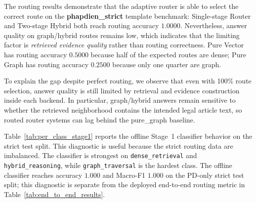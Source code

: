 \documentclass[11pt,twocolumn]{article}
\begin{document}
\begin{table}[!htbp]
\centering
\caption{End-to-end QA results on the strict Vietnamese legal QA test set. EM is near zero for all systems because legal answers are paraphrastic; F1 is the primary metric.}
\label{tab:end_to_end_results}
\scriptsize
\setlength{\tabcolsep}{2.4pt}
\end{table}

The routing results demonstrate that the adaptive router is
able to select the correct route on the \textbf{phapdien\_strict}
template benchmark: Single-stage Router and Two-stage Hybrid both
reach routing accuracy $1.0000$. Nevertheless, answer quality on
graph/hybrid routes remains low, which indicates that the limiting
factor is \emph{retrieved evidence quality} rather than routing
correctness. Pure Vector has routing accuracy $0.5000$ because
half of the expected routes are dense; Pure Graph has routing
accuracy $0.2500$ because only one quarter are graph.

To explain the gap despite perfect routing, we observe that
even with 100\% route selection, answer quality is still limited by
retrieval and evidence construction inside each backend.
In particular, graph/hybrid answers remain sensitive to whether the
retrieved neighborhood contains the intended legal article text,
so routed router systems can lag behind the pure\_graph baseline.

Table~\ref{tab:per_class_stage1} reports the offline Stage~1
classifier behavior on the strict test split. This diagnostic
is useful because the strict routing data are imbalanced. The
classifier is strongest on \texttt{dense\_retrieval} and
\texttt{hybrid\_reasoning}, while \texttt{graph\_traversal}
is the hardest class. The offline classifier reaches accuracy
$1.000$ and Macro-F1 $1.000$ on the PD-only strict test
split; this diagnostic is separate
from the deployed end-to-end routing metric in
Table~\ref{tab:end_to_end_results}.
\end{document}
